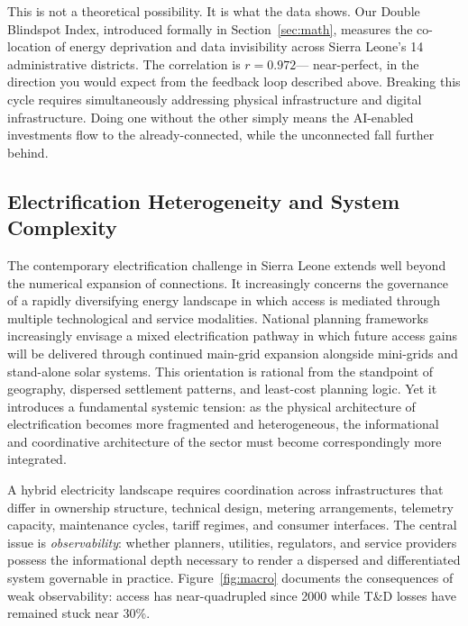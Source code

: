 \documentclass[preprint,12pt]{elsarticle}
\begin{document}
\medskip
This is not a theoretical possibility. It is what the data
shows. Our Double Blindspot Index, introduced formally in
Section~\ref{sec:math}, measures the co-location of energy
deprivation and data invisibility across Sierra Leone's 14
administrative districts. The correlation is $r = 0.972$---
near-perfect, in the direction you would expect from the
feedback loop described above. Breaking this cycle requires
simultaneously addressing physical infrastructure and digital
infrastructure. Doing one without the other simply means the
AI-enabled investments flow to the already-connected, while
the unconnected fall further behind.

\subsection{Electrification Heterogeneity and System Complexity}

The contemporary electrification challenge in Sierra Leone
extends well beyond the numerical expansion of connections.
It increasingly concerns the governance of a rapidly diversifying
energy landscape in which access is mediated through multiple
technological and service modalities. National planning frameworks
increasingly envisage a mixed electrification pathway in which
future access gains will be delivered through continued main-grid
expansion alongside mini-grids and stand-alone solar systems.
This orientation is rational from the standpoint of geography,
dispersed settlement patterns, and least-cost planning logic.
Yet it introduces a fundamental systemic tension: as the physical
architecture of electrification becomes more fragmented and
heterogeneous, the informational and coordinative architecture
of the sector must become correspondingly more integrated.

A hybrid electricity landscape requires coordination across
infrastructures that differ in ownership structure, technical
design, metering arrangements, telemetry capacity, maintenance
cycles, tariff regimes, and consumer interfaces. The central
issue is \textit{observability}: whether planners, utilities,
regulators, and service providers possess the informational depth
necessary to render a dispersed and differentiated system
governable in practice. Figure~\ref{fig:macro} documents the
consequences of weak observability: access has near-quadrupled
since 2000 while T\&D losses have remained stuck near 30\%.
\end{document}
